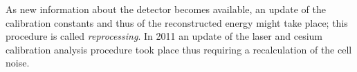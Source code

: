 As new information about the detector becomes available, an update of the
calibration constants and thus of the reconstructed energy might take place;
this procedure is called \emph{reprocessing}. In 2011 an update of the laser and
cesium calibration analysis procedure took place thus requiring a recalculation
of the cell noise.
